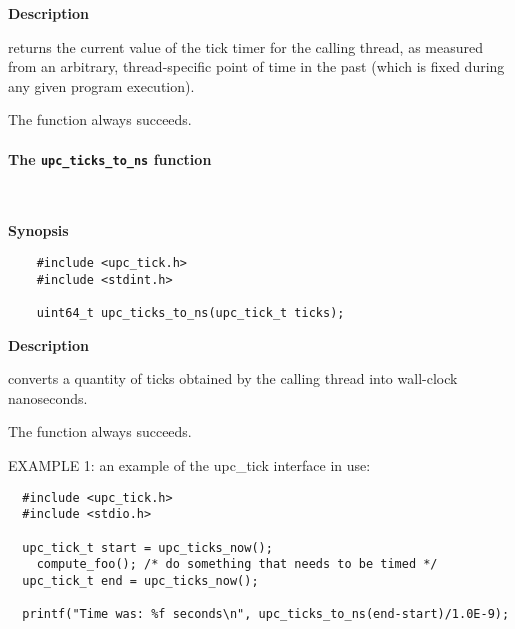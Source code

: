 {\bf Description}

 returns the current value of the tick timer for the calling thread,
as measured from an arbitrary, thread-specific point of time in the past (which is fixed
during any given program execution).

\np The function always succeeds.

\paragraph{The {\tt upc\_ticks\_to\_ns} function}\ \\
\label{upc-ticks-to-ns}

{\bf Synopsis}

\npf\vspace{-2.5em}
 \begin{verbatim}
    #include <upc_tick.h>
    #include <stdint.h>

    uint64_t upc_ticks_to_ns(upc_tick_t ticks);
\end{verbatim}

{\bf Description}

 converts a quantity of ticks obtained by the
calling thread into wall-clock nanoseconds.

\np The function always succeeds.

\np EXAMPLE 1: an example of the upc\_tick interface in use:
\begin{verbatim}
  #include <upc_tick.h>
  #include <stdio.h>

  upc_tick_t start = upc_ticks_now();
    compute_foo(); /* do something that needs to be timed */
  upc_tick_t end = upc_ticks_now();

  printf("Time was: %f seconds\n", upc_ticks_to_ns(end-start)/1.0E-9);
\end{verbatim}

\cbend
